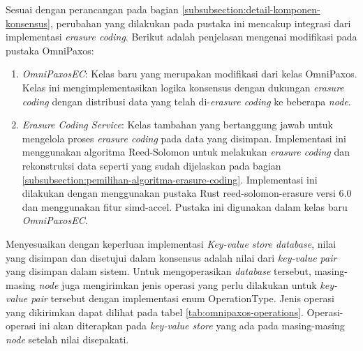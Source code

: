 Sesuai dengan perancangan pada bagian \ref{subsubsection:detail-komponen-konsensus}, perubahan yang dilakukan pada pustaka ini mencakup integrasi dari implementasi \textit{erasure coding}. Berikut adalah penjelasan mengenai modifikasi pada pustaka OmniPaxos:

\begin{enumerate}
  \item \textit{OmniPaxosEC}: Kelas baru yang merupakan modifikasi dari kelas OmniPaxos. Kelas ini mengimplementasikan logika konsensus dengan dukungan \textit{erasure coding} dengan distribusi data yang telah di-\textit{erasure coding} ke beberapa \textit{node}. 
  \item \textit{Erasure Coding Service}: Kelas tambahan yang bertanggung jawab untuk mengelola proses \textit{erasure coding} pada data yang disimpan. Implementasi ini menggunakan algoritma Reed-Solomon untuk melakukan \textit{erasure coding} dan rekonstruksi data seperti yang sudah dijelaskan pada bagian \ref{subsubsection:pemilihan-algoritma-erasure-coding}. Implementasi ini dilakukan dengan menggunakan pustaka Rust reed-solomon-erasure versi 6.0 dan menggunakan fitur simd-accel. Pustaka ini digunakan dalam kelas baru \textit{OmniPaxosEC}.
\end{enumerate}

Menyesuaikan dengan keperluan implementasi \textit{Key-value store database}, nilai yang disimpan dan disetujui dalam konsensus adalah nilai dari \textit{key-value pair} yang disimpan dalam sistem. Untuk mengoperasikan \textit{database} tersebut, masing-masing \textit{node} juga mengirimkan jenis operasi yang perlu dilakukan untuk \textit{key-value pair} tersebut dengan implementasi enum OperationType. Jenis operasi yang dikirimkan dapat dilihat pada tabel \ref{tab:omnipaxos-operations}. Operasi-operasi ini akan diterapkan pada \textit{key-value store} yang ada pada masing-masing \textit{node} setelah nilai disepakati.

